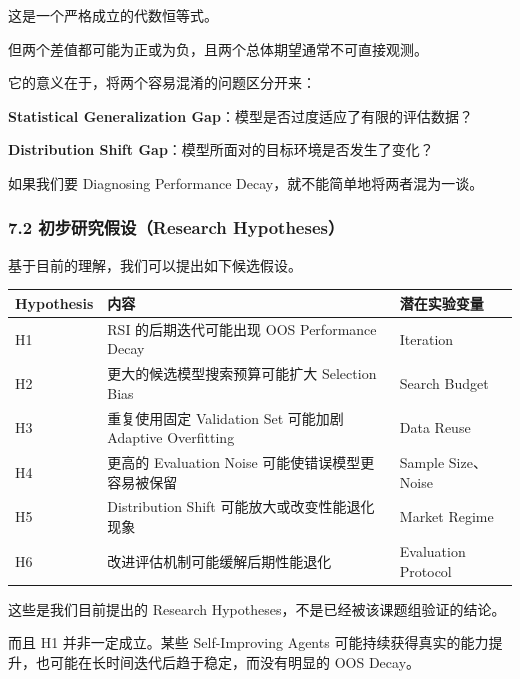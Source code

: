 这是一个严格成立的代数恒等式。

但两个差值都可能为正或为负，且两个总体期望通常不可直接观测。

它的意义在于，将两个容易混淆的问题区分开来：

\textbf{Statistical Generalization Gap}：模型是否过度适应了有限的评估数据？

\textbf{Distribution Shift Gap}：模型所面对的目标环境是否发生了变化？

如果我们要 Diagnosing Performance Decay，就不能简单地将两者混为一谈。

\hypertarget{part-1-03-0001-ux521dux6b65ux7814ux7a76ux5047ux8bberesearch-hypotheses}{%
\subsubsection{7.2 初步研究假设（Research Hypotheses）}\label{part-1-03-0001-ux521dux6b65ux7814ux7a76ux5047ux8bberesearch-hypotheses}}

基于目前的理解，我们可以提出如下候选假设。

\begin{readertable}
\begin{longtable}[]{@{}
  >{\raggedright\arraybackslash}p{}
  >{\raggedright\arraybackslash}p{}
  >{\raggedright\arraybackslash}p{}@{}}
\toprule
Hypothesis & 内容 & 潜在实验变量 \\
\midrule
\endhead
H1 & RSI 的后期迭代可能出现 OOS Performance Decay & Iteration \\
H2 & 更大的候选模型搜索预算可能扩大 Selection Bias & Search Budget \\
H3 & 重复使用固定 Validation Set 可能加剧 Adaptive Overfitting & Data Reuse \\
H4 & 更高的 Evaluation Noise 可能使错误模型更容易被保留 & Sample Size、Noise \\
H5 & Distribution Shift 可能放大或改变性能退化现象 & Market Regime \\
H6 & 改进评估机制可能缓解后期性能退化 & Evaluation Protocol \\
\bottomrule
\end{longtable}
\end{readertable}

这些是我们目前提出的 Research Hypotheses，不是已经被该课题组验证的结论。

而且 H1 并非一定成立。某些 Self-Improving Agents 可能持续获得真实的能力提升，也可能在长时间迭代后趋于稳定，而没有明显的 OOS Decay。

